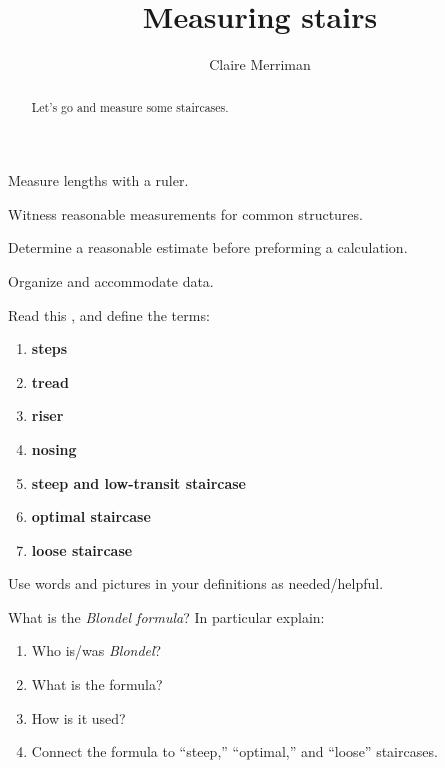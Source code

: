 \documentclass[handout,nooutcomes,noauthor,hints,12pt]{ximera}
\title{Measuring stairs}
\author{Claire Merriman}
\begin{document}
\begin{abstract}
  Let's go and measure some staircases.
\end{abstract}
\maketitle


\begin{listOutcomes}
\item Measure lengths with a ruler.
\item Witness reasonable measurements for common structures.
\item Determine a reasonable estimate before preforming a calculation.
\item Organize and accommodate data.
\end{listOutcomes}





\mynewpage


\begin{question}
Read this ,
and define the terms:
\begin{enumerate}
\item \textbf{steps}
\item \textbf{tread}
\item \textbf{riser}
\item \textbf{nosing}
\item \textbf{steep and low-transit staircase}
\item \textbf{optimal staircase}
\item \textbf{loose staircase}
\end{enumerate}
Use words and pictures in your definitions as needed/helpful.

\end{question}


\mynewpage

\begin{question}
  What is the \textit{Blondel formula}? In particular explain:
  \begin{enumerate}
  \item Who is/was \textit{Blondel}?
  \item What is the formula?
  \item How is it used?
  \item Connect the formula to ``steep,'' ``optimal,'' and ``loose''
    staircases.
  \end{enumerate}
\end{question}
\end{document}
